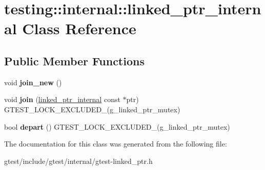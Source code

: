 \hypertarget{classtesting_1_1internal_1_1linked__ptr__internal}{}\section{testing\+:\+:internal\+:\+:linked\+\_\+ptr\+\_\+internal Class Reference}
\label{classtesting_1_1internal_1_1linked__ptr__internal}
\subsection*{Public Member Functions}
\begin{DoxyCompactItemize}
\item 
\mbox{\label{classtesting_1_1internal_1_1linked__ptr__internal_a742af1f65df2d5e2b7198a1b74264a83}} 
void {\bfseries join\+\_\+new} ()
\item 
\mbox{\label{classtesting_1_1internal_1_1linked__ptr__internal_acd5a341459f7e81b10b4112d8c764e2a}} 
void {\bfseries join} (\hyperlink{classtesting_1_1internal_1_1linked__ptr__internal}{linked\+\_\+ptr\+\_\+internal} const $\ast$ptr) G\+T\+E\+S\+T\+\_\+\+L\+O\+C\+K\+\_\+\+E\+X\+C\+L\+U\+D\+E\+D\+\_\+(g\+\_\+linked\+\_\+ptr\+\_\+mutex)
\item 
\mbox{\label{classtesting_1_1internal_1_1linked__ptr__internal_a8699e539d9702d363ef0351012d1b3ca}} 
bool {\bfseries depart} () G\+T\+E\+S\+T\+\_\+\+L\+O\+C\+K\+\_\+\+E\+X\+C\+L\+U\+D\+E\+D\+\_\+(g\+\_\+linked\+\_\+ptr\+\_\+mutex)
\end{DoxyCompactItemize}


The documentation for this class was generated from the following file\+:\begin{DoxyCompactItemize}
\item 
gtest/include/gtest/internal/gtest-\/linked\+\_\+ptr.\+h\end{DoxyCompactItemize}
